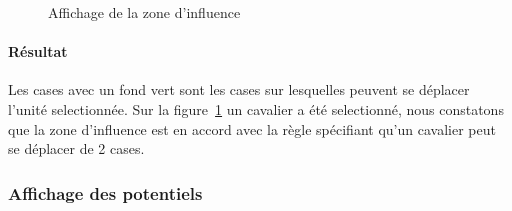 				\begin{figure}[!h]
				    \caption{Affichage de la zone d'influence}
				    \centering
				    \label{fig:affichage_zone_influence}
				\end{figure}

				\paragraph{Résultat\\}
					Les cases avec un fond vert sont les cases sur lesquelles peuvent se déplacer l'unité selectionnée. Sur la figure~\ref{fig:affichage_zone_influence} un cavalier a été selectionné, nous constatons que la zone d'influence est en accord avec la règle spécifiant qu'un cavalier peut se déplacer de 2 cases. 
					


			\subsubsection{Affichage des potentiels}

